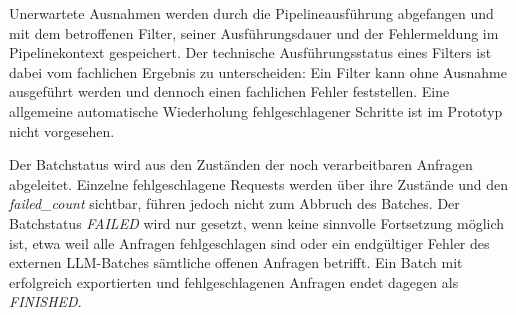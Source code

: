 Unerwartete Ausnahmen werden durch die Pipelineausführung abgefangen und mit dem betroffenen Filter, seiner Ausführungsdauer und der Fehlermeldung im Pipelinekontext 
gespeichert. Der technische Ausführungsstatus eines Filters ist dabei vom fachlichen Ergebnis zu unterscheiden: Ein Filter kann ohne Ausnahme ausgeführt werden und dennoch 
einen fachlichen Fehler feststellen. Eine allgemeine automatische Wiederholung fehlgeschlagener Schritte ist im Prototyp nicht vorgesehen.

Der Batchstatus wird aus den Zuständen der noch verarbeitbaren Anfragen abgeleitet. Einzelne fehlgeschlagene Requests werden über ihre Zustände und den \textit{failed\_count} 
sichtbar, führen jedoch nicht zum Abbruch des Batches. Der Batchstatus \textit{FAILED} wird nur gesetzt, wenn keine sinnvolle Fortsetzung möglich ist, etwa weil alle Anfragen 
fehlgeschlagen sind oder ein endgültiger Fehler des externen LLM-Batches sämtliche offenen Anfragen betrifft. Ein Batch mit erfolgreich exportierten und fehlgeschlagenen 
Anfragen endet dagegen als \textit{FINISHED}.